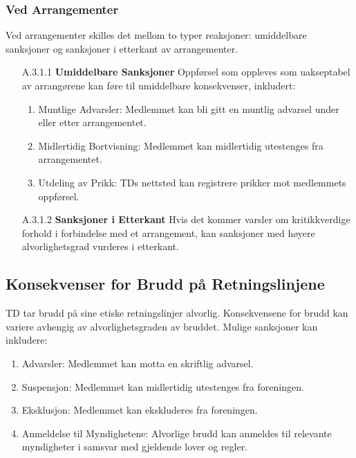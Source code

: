 \documentclass[11pt]{article}
\begin{document}
\subsubsection{Ved Arrangementer}
Ved arrangementer skilles det mellom to typer reaksjoner: umiddelbare sanksjoner og sanksjoner i etterkant av arrangementer.
 \begin{itemize}
     \item[A.3.1.1] \textbf{Umiddelbare Sanksjoner}
     \newline
     Oppførsel som oppleves som uakseptabel av arrangørene kan føre til umiddelbare konsekvenser, inkludert:
     \begin{enumerate}
         \item Muntlige Advarsler: Medlemmet kan bli gitt en muntlig advarsel under eller etter arrangementet.
         \item Midlertidig Bortvisning: Medlemmet kan midlertidig utestenges fra arrangementet.
         \item Utdeling av Prikk: TDs nettsted kan registrere prikker mot medlemmets oppførsel.
     \end{enumerate}
     \item[A.3.1.2] \textbf{Sanksjoner i Etterkant}
     \newline
     Hvis det kommer varsler om kritikkverdige forhold i forbindelse med et arrangement, kan sanksjoner med høyere alvorlighetsgrad vurderes i etterkant.

 \end{itemize}
 
\subsection{Konsekvenser for Brudd på Retningslinjene}
TD tar brudd på sine etiske retningslinjer alvorlig. Konsekvensene for brudd kan variere avhengig av alvorlighetsgraden av bruddet. Mulige sanksjoner kan inkludere:
\begin{enumerate}
    \item Advarsler: Medlemmet kan motta en skriftlig advarsel.
    \item Suspensjon: Medlemmet kan midlertidig utestenges fra foreningen.
    \item Eksklusjon: Medlemmet kan ekskluderes fra foreningen.
    \item Anmeldelse til Myndighetene: Alvorlige brudd kan anmeldes til relevante myndigheter i samsvar med gjeldende lover og regler.
\end{enumerate}
 
\end{document}
